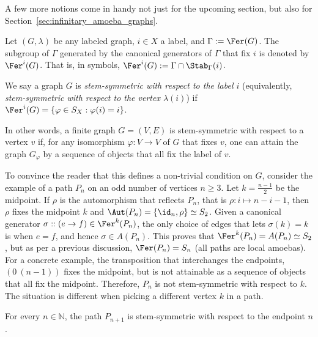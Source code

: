 A few more notions come in handy not just for the upcoming section, but also for Section~\ref{sec:infinitary_amoeba_graphs}.

\begin{definition}\label{def:stem-symmetric}
    Let $(G,\lambda)$ be any labeled graph, $i\in X$ a label, and $\Gamma:=\Fer(G)$.
    The subgroup of $\Gamma$ generated by the canonical generators of $\Gamma$ that fix $i$ is denoted by $\Fer^i(G)$.
    That is, in symbols, $\Fer^i(G):=\Gamma\cap\Stab_\Gamma(i)$.

    We say a graph $G$ is \emph{stem-symmetric with respect to the label $i$} (equivalently, \emph{stem-symmetric with respect to the vertex $\lambda(i)$}) if $\Fer^i(G)=\{\varphi\in S_X:\varphi(i)=i\}$.
\end{definition}

In other words, a finite graph $G=(V,E)$ is stem-symmetric with respect to a vertex $v$ if, for any isomorphism $\varphi\colon V\to V$ of $G$ that fixes $v$, one can attain the graph $G_\varphi$ by a sequence of \tfer objects that all fix the label of $v$.

To convince the reader that this defines a non-trivial condition on $G$, consider the example of a path $P_n$ on an odd number of vertices $n\geq3$.
Let $k=\frac{n-1}2$ be the midpoint.
If $\rho$ is the automorphism that reflects $P_n$, that is $\rho\colon i\mapsto n-i-1$, then $\rho$ fixes the midpoint $k$ and $\Aut(P_n)=\{\id_n,\rho\}\simeq S_2$.
Given a canonical generator $\sigma::(e\to f)\in\Fer^k(P_n)$, the only choice of edges that lets $\sigma(k)=k$ is when $e=f$, and hence $\sigma\in A(P_n)$.
This proves that $\Fer^k(P_n)=A(P_n)\simeq S_2$, but as per a previous discussion, $\Fer(P_n)=S_n$ (all paths are local amoebas).
For a concrete example, the transposition that interchanges the endpoints, $(0\ (n-1))$ fixes the midpoint, but is not attainable as a sequence of \tfer objects that all fix the midpoint.
Therefore, $P_n$ is not stem-symmetric with respect to $k$.
The situation is different when picking a different vertex $k$ in a path.

\begin{lemma}\label{lemma:path-stem-symmetric}
    For every $n\in\mathbb N$, the path $P_{n+1}$ is stem-symmetric with respect to the endpoint $n$.
\end{lemma}

